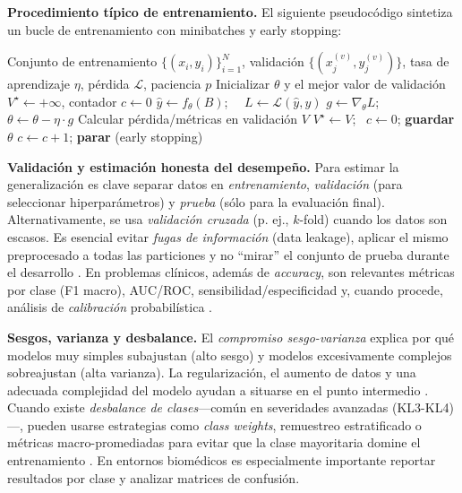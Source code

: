 \documentclass[11pt,spanish,listoffigures,listoftables]{tfgetsinf}
\begin{document}
\noindent \textbf{Procedimiento típico de entrenamiento.} El siguiente pseudocódigo sintetiza un bucle de entrenamiento con minibatches y early stopping:
\begin{algorithmic}
	\REQUIRE Conjunto de entrenamiento $\{(x_i,y_i)\}_{i=1}^N$, validación $\{(x_j^{(v)},y_j^{(v)})\}$, tasa de aprendizaje $\eta$, pérdida $\mathcal{L}$, paciencia $p$
	\STATE Inicializar $\theta$ y el mejor valor de validación $V^\star \leftarrow +\infty$, contador $c\leftarrow0$
	\STATE $\hat{y} \leftarrow f_\theta(B)$; \ \ $L \leftarrow \mathcal{L}(\hat{y}, y)$
	\STATE $g \leftarrow \nabla_\theta L$; \ \ $\theta \leftarrow \theta - \eta \cdot g$
	\ENDFOR
	\STATE Calcular pérdida/métricas en validación $V$
	 \STATE $V^\star \leftarrow V$; \ $c\leftarrow 0$; \textbf{guardar} $\theta$
	\ELSE \STATE $c\leftarrow c+1$;  \STATE \textbf{parar} (early stopping) \ENDIF
	\ENDIF
	\ENDFOR
\end{algorithmic}

\noindent \textbf{Validación y estimación honesta del desempeño.} Para estimar la generalización es clave separar datos en \textit{entrenamiento}, \textit{validación} (para seleccionar hiperparámetros) y \textit{prueba} (sólo para la evaluación final). Alternativamente, se usa \textit{validación cruzada} (p. ej., $k$-fold) cuando los datos son escasos. Es esencial evitar \textit{fugas de información} (data leakage), aplicar el mismo preprocesado a todas las particiones y no “mirar” el conjunto de prueba durante el desarrollo \cite{Bishop2006}. En problemas clínicos, además de \textit{accuracy}, son relevantes métricas por clase (F1 macro), AUC/ROC, sensibilidad/especificidad y, cuando procede, análisis de \textit{calibración} probabilística \cite{Bishop2006}.

\noindent \textbf{Sesgos, varianza y desbalance.} El \textit{compromiso sesgo-varianza} explica por qué modelos muy simples subajustan (alto sesgo) y modelos excesivamente complejos sobreajustan (alta varianza). La regularización, el aumento de datos y una adecuada complejidad del modelo ayudan a situarse en el punto intermedio \cite{Bishop2006}. Cuando existe \textit{desbalance de clases}—común en severidades avanzadas (KL3-KL4)—, pueden usarse estrategias como \textit{class weights}, remuestreo estratificado o métricas macro-promediadas para evitar que la clase mayoritaria domine el entrenamiento \cite{Bishop2006}. En entornos biomédicos es especialmente importante reportar resultados por clase y analizar matrices de confusión.
\end{document}
